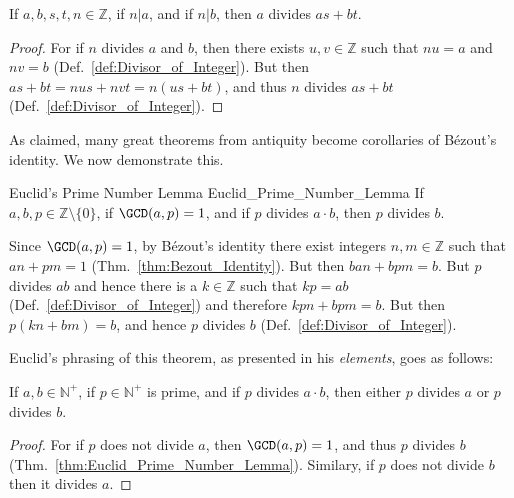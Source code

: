 \documentclass{article}                                                        %
\begin{document}
            \begin{theorem}
                \label{thm:n_Div_AB_then_A_Div_AS_BT}%
                If $a,b,s,t,n\in\mathbb{Z}$, if $n|a$, and if $n|b$, then $a$
                divides $as+bt$.
            \end{theorem}
            \begin{proof}
                For if $n$ divides $a$ and $b$, then there exists
                $u,v\in\mathbb{Z}$ such that $nu=a$ and $nv=b$
                (Def.~\ref{def:Divisor_of_Integer}). But then
                $as+bt=nus+nvt=n(us+bt)$, and thus $n$ divides $as+bt$
                (Def.~\ref{def:Divisor_of_Integer}).
            \end{proof}
            As claimed, many great theorems from antiquity become corollaries of
            B\'{e}zout's identity. We now demonstrate this.
            \begin{ftheorem}{Euclid's Prime Number Lemma}
                            {Euclid_Prime_Number_Lemma}
                If $a,b,p\in\mathbb{Z}\setminus\{0\}$, if $\GCD(a,p)=1$, and if
                $p$ divides $a\cdot{b}$, then $p$ divides $b$.
            \end{ftheorem}
            \begin{bproof}
                Since $\GCD(a,p)=1$, by B\'{e}zout's identity there exist
                integers $n,m\in\mathbb{Z}$ such that $an+pm=1$
                (Thm.~\ref{thm:Bezout_Identity}). But then $ban+bpm=b$. But $p$
                divides $ab$ and hence there is a $k\in\mathbb{Z}$ such that
                $kp=ab$ (Def.~\ref{def:Divisor_of_Integer}) and therefore
                $kpn+bpm=b$. But then $p(kn+bm)=b$, and hence $p$ divides $b$
                (Def.~\ref{def:Divisor_of_Integer}).
            \end{bproof}
            Euclid's phrasing of this theorem, as presented in his
            \textit{elements}, goes as follows:
            \begin{theorem}
                \label{thm:Prime_Div_AB_then_PdivA_or_PdivB}%
                If $a,b\in\mathbb{N}^{+}$, if $p\in\mathbb{N}^{+}$ is prime, and
                if $p$ divides $a\cdot{b}$, then either $p$ divides $a$ or $p$
                divides $b$.
            \end{theorem}
            \begin{proof}
                For if $p$ does not divide $a$, then $\GCD(a,p)=1$, and thus
                $p$ divides $b$ (Thm.~\ref{thm:Euclid_Prime_Number_Lemma}).
                Similary, if $p$ does not divide $b$ then it divides $a$.
            \end{proof}
\end{document}
